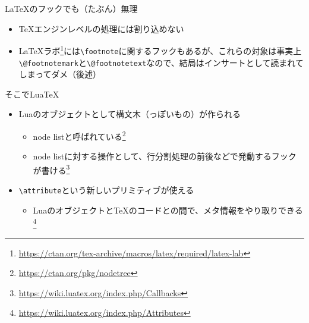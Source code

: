 \documentclass[unicode,14pt]{beamer}
\def\nftncm{\texttt{\textbackslash{}footnote}}
\begin{document}
\begin{frame}[t]{\LaTeX{}のフックでも（たぶん）無理}
  \sffamily
  \begin{itemize}
\item \TeX{}エンジンレベルの処理には割り込めない
\item \LaTeX{}ラボ\footnote{\url{https://ctan.org/tex-archive/macros/latex/required/latex-lab}}には\nftncm{}に関するフックもあるが、これらの対象は事実上\texttt{\textbackslash{}@footnotemark}と\texttt{\textbackslash{}@footnotetext}なので、結局はインサートとして読まれてしまってダメ（後述）
  \end{itemize}
\end{frame}


\begin{frame}[t]{そこでLua\TeX}
  \sffamily
  \begin{itemize}
\item Luaのオブジェクトとして構文木（っぽいもの）が作られる\\
    \begin{itemize} 
\item node listと呼ばれている\footnote{\url{https://ctan.org/pkg/nodetree}}
\item node listに対する操作として、行分割処理の前後などで発動するフックが書ける\footnote{\url{https://wiki.luatex.org/index.php/Callbacks}}
    \end{itemize} 
\item \texttt{\textbackslash{}attribute}という新しいプリミティブが使える\\
    \begin{itemize} 
\item LuaのオブジェクトとTeXのコードとの間で、メタ情報をやり取りできる\footnote{\url{https://wiki.luatex.org/index.php/Attributes}}
    \end{itemize} 
  \end{itemize} 
\end{frame}

\end{document}
